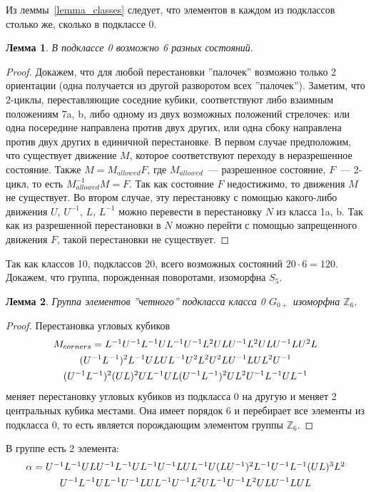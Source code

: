 \documentclass[utf8,a4paper,12pt]{article}
\newtheorem{lemma_cub}{Лемма}[section]
\begin{document}
Из леммы~\ref{lemma_classes} следует, что элементов в каждом из подклассов столько же, сколько в подклассе 0.
\begin{lemma_cub}
В подклассе 0 возможно 6 разных состояний.
\end{lemma_cub}
\begin{proof}
Докажем, что для любой перестановки ''палочек'' возможно только 2 ориентации (одна получается из другой разворотом всех ''палочек'').
Заметим, что 2-циклы, переставляющие соседние кубики, соответствуют либо взаимным положениям 7a, b, либо одному из двух возможных положений стрелочек: или одна посередине направлена против двух других, или одна сбоку направлена против двух других в единичной перестановке.
В первом случае предположим, что существует движение $M$, которое соответствуют переходу в неразрешенное состояние. Также $M=M_{allowed}F$, где $M_{allowed}$~--- разрешенное состояние, $F$~--- 2-цикл, то есть $M_{allowed}^{-1}M=F$. Так как состояние $F$ недостижимо, то движения $M$ не существует. Во втором случае, эту перестановку с помощью какого-либо движения $U$, $U^{-1}$, $L$, $L^{-1}$ можно перевести в перестановку $N$ из класса 1a, b. Так как из разрешенной перестановки в $N$ можно перейти с помощью запрещенного движения $F$, такой перестановки не существует.
\end{proof}
Так как классов 10, подклассов 20, всего возможных состояний $20\cdot 6=120$.
Докажем, что группа, порожденная поворотами, изоморфна $S_5$.
\begin{lemma_cub}
\label{lemma4}
Группа элементов ''четного'' подкласса класса 0 $G_{0+}$ изоморфна $\mathbb{Z}_6$.
\end{lemma_cub}
\begin{proof}
Перестановка угловых кубиков
\begin{multline*}
$$
M_{corners}=L^{-1}U^{-1}L^{-1}UL^{-1}U^{-1}L^2ULU^{-1}L^2ULU^{-1}LU^2L \\
	(U^{-1}L^{-1})^2L^{-1}ULUL^{-1}U^2L^2U^2LU^{-1}LUL^2U^{-1} \\
		(U^{-1}L^{-1})^2(UL)^2UL^{-1}UL(U^{-1}L^{-1})^2UL^2U^{-1}L^{-1}UL^{-1}
$$
\end{multline*}
меняет перестановку угловых кубиков из подкласса 0 на другую и меняет 2 центральных кубика местами. Она имеет порядок 6 и перебирает все элементы из подкласса 0, то есть является порождающим элементом группы $\mathbb{Z}_6$.
\end{proof}
В группе есть 2 элемента:
\begin{multline*} %
$$
\alpha=U^{-1}L^{-1}ULU^{-1}L^{-1}UL^{-1}U^{-1}LUL^{-1}U(LU^{-1})^2L^{-1}U^{-1}L^{-1}(UL)^3L^2 \\
	U^{-1}L^{-1}UL^{-1}U^{-1}LUL^{-1}U^{-1}L^2UL^{-1}U^{-1}L^2ULU^{-1}LUL
$$
\end{multline*}
\end{document}
